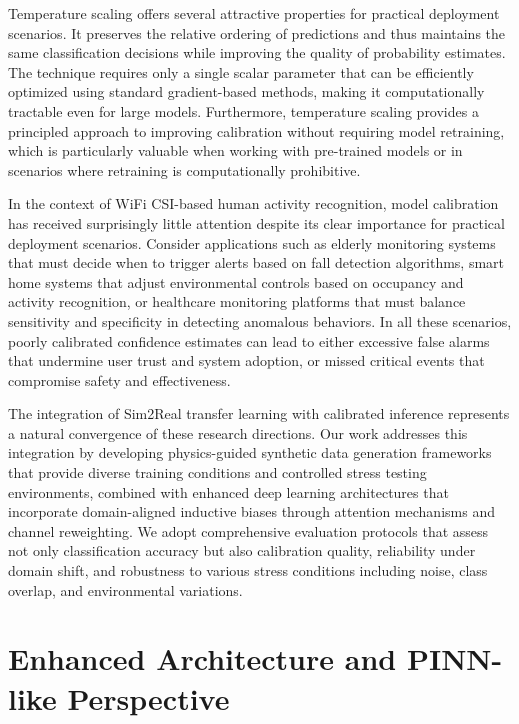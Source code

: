 \documentclass[journal]{IEEEtran}
\begin{document}
Temperature scaling offers several attractive properties for practical deployment scenarios. It preserves the relative ordering of predictions and thus maintains the same classification decisions while improving the quality of probability estimates. The technique requires only a single scalar parameter that can be efficiently optimized using standard gradient-based methods, making it computationally tractable even for large models. Furthermore, temperature scaling provides a principled approach to improving calibration without requiring model retraining, which is particularly valuable when working with pre-trained models or in scenarios where retraining is computationally prohibitive.

In the context of WiFi CSI-based human activity recognition, model calibration has received surprisingly little attention despite its clear importance for practical deployment scenarios. Consider applications such as elderly monitoring systems that must decide when to trigger alerts based on fall detection algorithms, smart home systems that adjust environmental controls based on occupancy and activity recognition, or healthcare monitoring platforms that must balance sensitivity and specificity in detecting anomalous behaviors. In all these scenarios, poorly calibrated confidence estimates can lead to either excessive false alarms that undermine user trust and system adoption, or missed critical events that compromise safety and effectiveness.

The integration of Sim2Real transfer learning with calibrated inference represents a natural convergence of these research directions. Our work addresses this integration by developing physics-guided synthetic data generation frameworks that provide diverse training conditions and controlled stress testing environments, combined with enhanced deep learning architectures that incorporate domain-aligned inductive biases through attention mechanisms and channel reweighting. We adopt comprehensive evaluation protocols that assess not only classification accuracy but also calibration quality, reliability under domain shift, and robustness to various stress conditions including noise, class overlap, and environmental variations.

\section{Enhanced Architecture and PINN-like Perspective}
\end{document}
